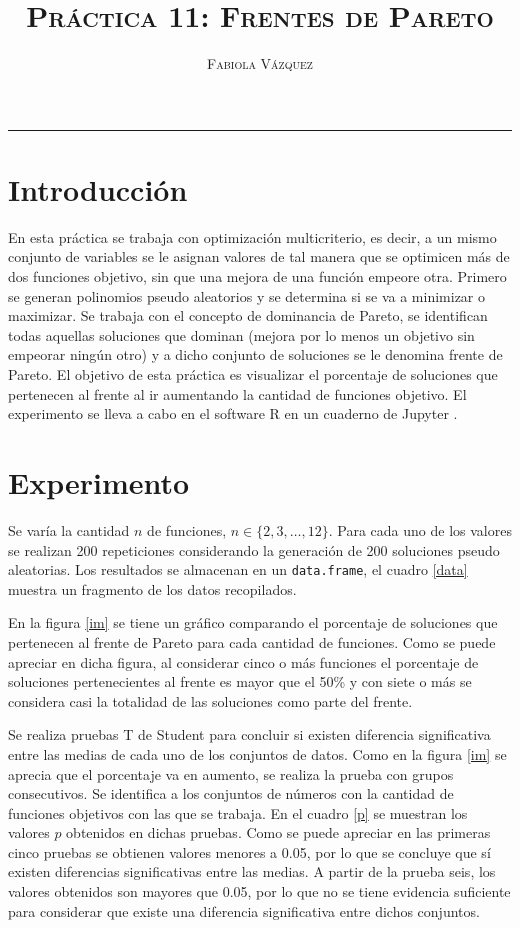 \documentclass[12pt,letterpaper]{article}
\title{\textsc{Práctica 11: Frentes de Pareto}}
\author{\textsc{Fabiola Vázquez}}
\begin{document}
\maketitle

\hrule
\section{Introducción}
En esta práctica \cite{elisapractica10} se trabaja con optimización multicriterio, es decir, a un mismo conjunto de variables se le asignan valores de tal manera que se optimicen más de dos funciones objetivo, sin que una mejora de una función empeore otra. Primero se generan polinomios pseudo aleatorios y se determina si se va a minimizar o maximizar. Se trabaja con el concepto de dominancia de Pareto, se identifican todas aquellas soluciones que dominan (mejora por lo menos un objetivo sin empeorar ningún otro) y a dicho conjunto de soluciones se le denomina frente de Pareto. El objetivo de esta práctica es visualizar el porcentaje de soluciones que pertenecen al frente al ir aumentando la cantidad de funciones objetivo. El experimento se lleva a cabo en el software R \cite{R} en un cuaderno de Jupyter \cite{jupyter}.

\section{Experimento}
Se varía la cantidad $n$ de funciones, $n \in \{2,3,\ldots,12\}$. Para cada uno de los valores se realizan 200 repeticiones considerando la generación de 200 soluciones pseudo aleatorias. Los resultados se almacenan en un \texttt{data.frame}, el cuadro \ref{data} muestra un fragmento de los datos recopilados.

En la figura \ref{im} se tiene un gráfico comparando el porcentaje de soluciones que pertenecen al frente de Pareto para cada cantidad de funciones. Como se puede apreciar en dicha figura, al considerar cinco o más funciones el porcentaje de soluciones pertenecientes al frente es mayor que el 50\% y con siete o más se considera casi la totalidad de las soluciones como parte del frente. 

Se realiza pruebas T de Student para concluir si existen diferencia significativa entre las medias de cada uno de los conjuntos de datos. Como en la figura \ref{im} se aprecia que el porcentaje va en aumento, se realiza la prueba con grupos consecutivos. Se identifica a los conjuntos de números con la cantidad de funciones objetivos con las que se trabaja. En el cuadro \ref{p} se muestran los valores $p$ obtenidos en dichas pruebas. Como se puede apreciar en las primeras cinco pruebas se obtienen valores menores a 0.05, por lo que se concluye que sí existen diferencias significativas entre las medias. A partir de la prueba seis, los valores obtenidos son mayores que 0.05, por lo que no se tiene evidencia suficiente para considerar que existe una diferencia significativa entre dichos conjuntos.
\end{document}
